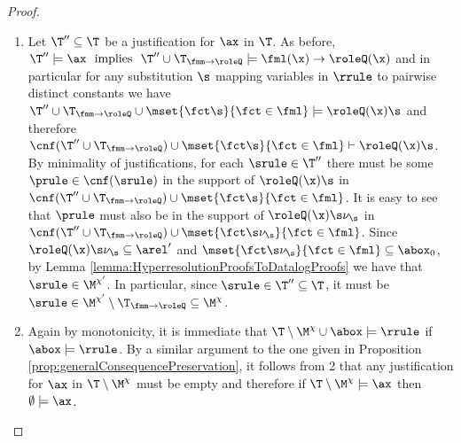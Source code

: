 \begin{proof}
\begin{enumerate}
\item 
Let $\T''\subseteq \T$ be a justification for $\ax$ in $\T$.
As before,
$\T''\models \ax \text{\ \  implies\ \ } 
\T''\cup\T_{\fmm\to\roleQ}\models \fml(\x)\to\roleQ(\x)$
and in particular for any substitution $\s$ mapping variables in $\rrule$ to pairwise distinct constants
we have 
$\T''\cup\T_{\fmm\to\roleQ} \cup \mset{\fct\s}{\fct\in\fml}\models \roleQ(\x)\s$
and therefore
$\cnf(\T''\cup\T_{\fmm\to\roleQ}) \cup \mset{\fct\s}{\fct\in\fml}\vdash \roleQ(\x)\s$.
%
By minimality of justifications, for each $\srule\in\T''$ there must be some $\prule\in\cnf(\srule)$
in the support of $\roleQ(\x)\s$ in $\cnf(\T''\cup\T_{\fmm\to\roleQ})\cup\mset{\fct\s}{\fct\in\fml} $.
It is easy to see that $\prule$ must also be in the support of $\roleQ(\x)\s\nu_{\s}$ in 
$\cnf(\T''\cup\T_{\fmm\to\roleQ}) \cup \mset{\fct\s\nu_{\s}}{\fct\in\fml}$.
Since $\roleQ(\x)\s\nu_{\s}\subseteq \arel'$
and $\mset{\fct\s\nu_{\s}}{\fct\in\fml}\subseteq \abox_0$,
by Lemma \ref{lemma:HyperresolutionProofsToDatalogProofs}
we have  that $\srule\in\M^{\chi'}$. In particular, since $\srule\in\T''\subseteq \T$, 
it must be 
$\srule\in\M^{\chi'} \setminus \T_{\fmm\to\roleQ} \subseteq \M^{\chi}$.

\item Again by monotonicity, it is immediate that  $\T\setminus\M^{\chi}\cup\abox\models \rrule$ if $\abox\models \rrule$.
By a similar argument to the one given in Proposition \ref{prop:generalConsequencePreservation}, it follows from 2 
that any justification for $\ax$ in $\T\setminus\M^{\chi}$ must be empty and therefore 
if $\T\setminus \M^{\chi}\models \ax$ then $\emptyset\models \ax$.\qedhere
\end{enumerate}
\end{proof}


